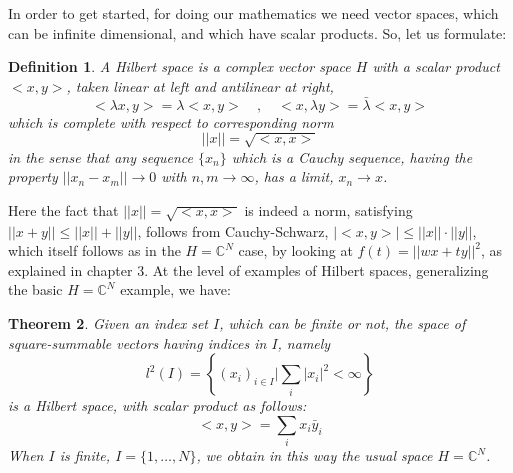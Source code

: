 \documentclass[12pt]{amsbook}
\newtheorem{theorem}{Theorem}[chapter]
\newtheorem{definition}[theorem]{Definition}
\begin{document}
In order to get started, for doing our mathematics we need vector spaces, which can be infinite dimensional, and which have scalar products. So, let us formulate:


\begin{definition}
A Hilbert space is a complex vector space $H$ with a scalar product $<x,y>$, taken linear at left and antilinear at right,
$$<\lambda x,y>=\lambda<x,y>\quad,\quad <x,\lambda y>=\bar{\lambda}<x,y>$$
which is complete with respect to corresponding norm
$$||x||=\sqrt{<x,x>}$$
in the sense that any sequence $\{x_n\}$ which is a Cauchy sequence, having the property $||x_n-x_m||\to0$ with $n,m\to\infty$, has a limit, $x_n\to x$.
\end{definition}

Here the fact that $||x||=\sqrt{<x,x>}$ is indeed a norm, satisfying $||x+y||\leq||x||+||y||$, follows from Cauchy-Schwarz, $|<x,y>|\leq||x||\cdot||y||$, which itself follows as in the $H=\mathbb C^N$ case, by looking at $f(t)=||wx+ty||^2$, as explained in chapter 3. At the level of examples of Hilbert spaces, generalizing the basic $H=\mathbb C^N$ example, we have:


\begin{theorem}
Given an index set $I$, which can be finite or not, the space of square-summable vectors having indices in $I$, namely
$$l^2(I)=\left\{(x_i)_{i\in I}\Big|\sum_i|x_i|^2<\infty\right\}$$
is a Hilbert space, with scalar product as follows:
$$<x,y>=\sum_ix_i\bar{y}_i$$
When $I$ is finite, $I=\{1,\ldots,N\}$, we obtain in this way the usual space $H=\mathbb C^N$.
\end{theorem}
\end{document}
